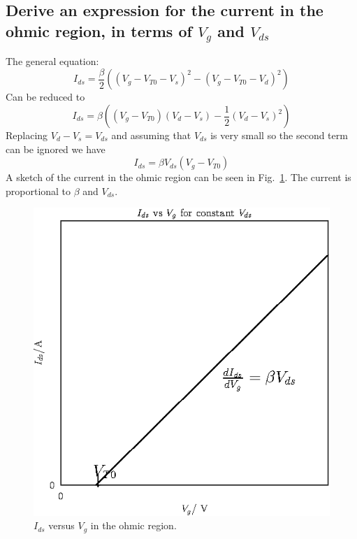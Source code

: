 \subsection{Derive an expression for the current in the ohmic region, in terms of \(V_g\) and \(V_{ds}\)}
The general equation:
\begin{equation*}
    I_{ds} = \frac{\beta}{2}\left(\left(V_g-V_{T0}-V_s\right)^2-\left(V_g-V_{T0} - V_d\right)^2\right)
\end{equation*}
Can be reduced to 
\begin{equation*}
    I_{ds} = \beta\left(\left(V_g-V_{T0}\right)\left(V_d-V_s\right) - \frac{1}{2}\left(V_d-V_s\right)^2\right)
\end{equation*}
Replacing \(V_d-V_s = V_{ds}\) and assuming that \(V_{ds}\) is very small so the second term can be ignored we
have
\begin{equation*}
    I_{ds} = \beta V_{ds}\left(V_g-V_{T0}\right) 
\end{equation*}
A sketch of the current in the ohmic region can be seen in Fig.~\ref{fig:q3}. The current is proportional to
\(\beta\) and \(V_{ds}\).
\begin{figure}
    \center
    \includegraphics{prelab3.eps}
    \caption{\(I_{ds}\) versus \(V_g\) in the ohmic region.}
    \label{fig:q3}
\end{figure}

